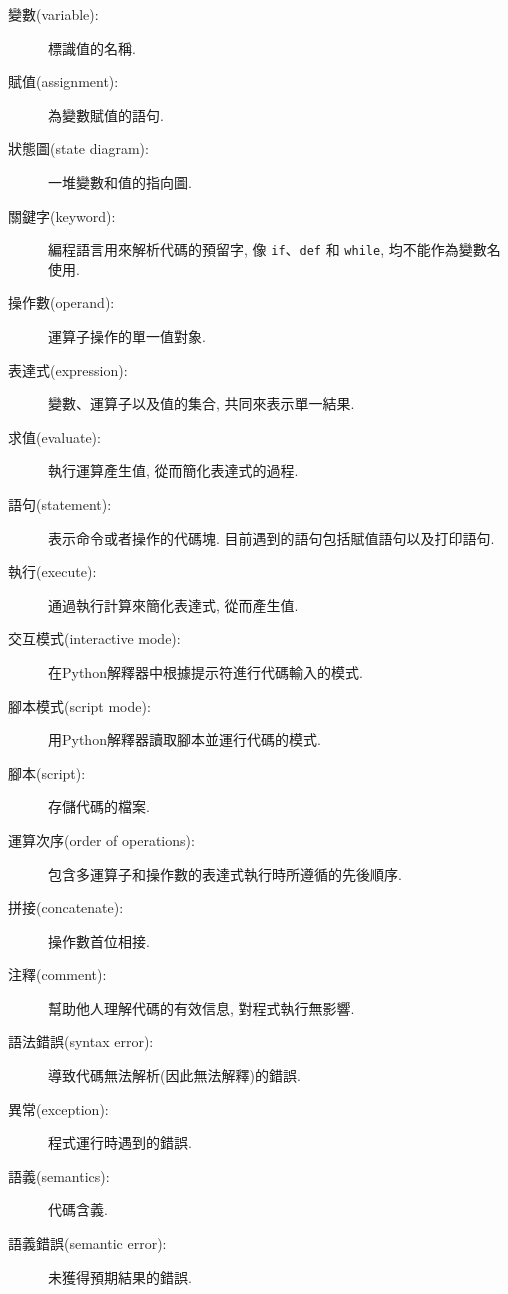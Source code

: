 \documentclass[10pt]{book}
\begin{document}
\begin{description}

\item[變數(variable):]  標識值的名稱. 

\item[賦值(assignment):]  為變數賦值的語句. 

\item[狀態圖(state diagram):]  一堆變數和值的指向圖. 

\item[關鍵字(keyword):]  編程語言用來解析代碼的預留字, 像 {\tt if}、{\tt  def} 和 {\tt while}, 
均不能作為變數名使用. 

\item[操作數(operand):]  運算子操作的單一值對象. 

\item[表達式(expression):]  變數、運算子以及值的集合, 共同來表示單一結果. 

\item[求值(evaluate):]  執行運算產生值, 從而簡化表達式的過程. 

\item[語句(statement):]  表示命令或者操作的代碼塊. 目前遇到的語句包括賦值語句以及打印語句. 

\item[執行(execute):]  通過執行計算來簡化表達式, 從而產生值.

\item[交互模式(interactive mode):] 在Python解釋器中根據提示符進行代碼輸入的模式. 

\item[腳本模式(script mode):] 用Python解釋器讀取腳本並運行代碼的模式. 

\item[腳本(script):] 存儲代碼的檔案. 

\item[運算次序(order of operations):]  包含多運算子和操作數的表達式執行時所遵循的先後順序. 

\item[拼接(concatenate):]  操作數首位相接. 

\item[注釋(comment):]  幫助他人理解代碼的有效信息, 對程式執行無影響. 

\item[語法錯誤(syntax error):] 導致代碼無法解析(因此無法解釋)的錯誤. 

\item[異常(exception):]  程式運行時遇到的錯誤. 

\item[語義(semantics):]  代碼含義. 

\item[語義錯誤(semantic error):]   未獲得預期結果的錯誤. 

\end{description}
\end{document}
